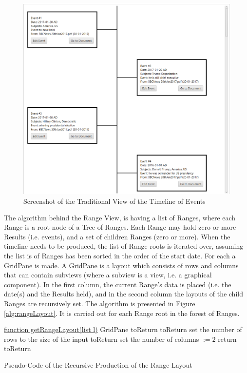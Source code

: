 \begin{figure}[H]
\caption{Screenshot of the Traditional View of the Timeline of Events}
\label{fig:traditionalView}
\includegraphics[width=\linewidth]{traditionalView.png}
\centering
\end{figure}

\par The algorithm behind the Range View, is having a list of Ranges, where each Range is a root node of a Tree of Ranges. Each Range may hold zero or more Results (i.e. events), and a set of children Ranges (zero or more). When the timeline needs to be produced, the list of Range roots is iterated over, assuming the list is of Ranges has been sorted in the order of the start date. For each a GridPane is made. A GridPane is a layout which consists of rows and columns that can contain subviews (where a subview is a view, i.e. a graphical component). In the first column, the current Range's data is placed (i.e. the date(s) and the Results held), and in the second column the layouts of the child Ranges are recursively set. The algorithm is presented in Figure \ref{alg:rangeLayout}. It is carried out for each Range root in the forest of Ranges.

\begin{algorithm}[H]
\underline{function getRangeLayout(list l)}\;
GridPane toReturn\;
toReturn set the number of rows to the size of the input\;
toReturn set the number of columns $:= 2$\;
return toReturn\;
\caption{Pseudo-Code of the Recursive Production of the Range Layout}
\label{alg:rangeLayout}
\end{algorithm}

